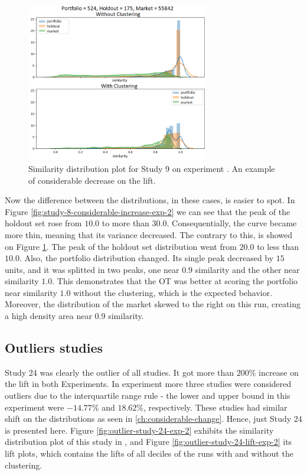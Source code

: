 \begin{figure}[!ht]
   \centering
   \includegraphics[width=8cm]{fig/ch4-study-9-considerable-decrease-exp-1.png}
   \caption{Similarity distribution plot for Study 9 on experiment \nameExperimentI{}. An example of considerable decrease on the lift.}
   \label{fig:study-9-considerable-decrease-exp-1}
\end{figure}

Now the difference between the distributions, in these cases, is easier to spot. In Figure \ref{fig:study-8-considerable-increase-exp-2} we can see that the peak of the holdout set rose from $10.0$ to more than $30.0$. Consequentially, the curve became more thin, meaning that its variance decreased. The contrary to this, is showed on Figure \ref{fig:study-9-considerable-decrease-exp-1}. The peak of the holdout set distribution went from $20.0$ to less than $10.0$. Also, the portfolio distribution changed. Its single peak decreased by $15$ units, and it was splitted in two peaks, one near $0.9$ similarity and the other near similarity $1.0$. This demonstrates that the OT was better at scoring the portfolio near similarity $1.0$ without the clustering, which is the expected behavior. Moreover, the distribution of the market skewed to the right on this run, creating a high density area near $0.9$ similarity. 

\subsection{Outliers studies}
\label{ch:outliers}

Study 24 was clearly the outlier of all studies. It got more than $200\%$ increase on the lift in both Experiments. In experiment \nameExperimentII{} more three studies were considered outliers due to the interquartile range rule - the lower and upper bound in this experiment were $-14.77\%$ and $18.62\%$, respectively. These studies had similar shift on the distributions as seen in \ref{ch:considerable-change}. Hence, just Study 24 is presented here. Figure \ref{fig:outlier-study-24-exp-2} exhibits the similarity distribution plot of this study in \nameExperimentII{}, and Figure \ref{fig:outlier-study-24-lift-exp-2} its lift plots, which contains the lifts of all deciles of the runs with and without the clustering.

